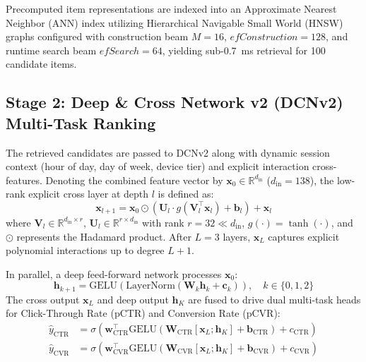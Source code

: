 Precomputed item representations are indexed into an Approximate Nearest Neighbor (ANN) index utilizing Hierarchical Navigable Small World (HNSW) graphs \cite{malkov2020efficient} configured with construction beam $M=16$, $efConstruction=128$, and runtime search beam $efSearch=64$, yielding sub-0.7~ms retrieval for 100 candidate items.

\subsection{Stage 2: Deep \& Cross Network v2 (DCNv2) Multi-Task Ranking}
The retrieved candidates are passed to DCNv2 \cite{wang2021dcn} along with dynamic session context (hour of day, day of week, device tier) and explicit interaction cross-features. Denoting the combined feature vector by $\mathbf{x}_0 \in \mathbb{R}^{d_{\text{in}}}$ ($d_{\text{in}} = 138$), the low-rank explicit cross layer at depth $l$ is defined as:
\begin{equation}
\mathbf{x}_{l+1} = \mathbf{x}_0 \odot \left( \mathbf{U}_l \cdot g\left( \mathbf{V}_l^\top \mathbf{x}_l \right) + \mathbf{b}_l \right) + \mathbf{x}_l
\end{equation}
where $\mathbf{V}_l \in \mathbb{R}^{d_{\text{in}} \times r}$, $\mathbf{U}_l \in \mathbb{R}^{r \times d_{\text{in}}}$ with rank $r = 32 \ll d_{\text{in}}$, $g(\cdot) = \tanh(\cdot)$, and $\odot$ represents the Hadamard product. After $L=3$ layers, $\mathbf{x}_L$ captures explicit polynomial interactions up to degree $L+1$.

In parallel, a deep feed-forward network processes $\mathbf{x}_0$:
\begin{equation}
\mathbf{h}_{k+1} = \text{GELU}\left(\text{LayerNorm}\left(\mathbf{W}_k \mathbf{h}_k + \mathbf{c}_k\right)\right), \quad k \in \{0, 1, 2\}
\end{equation}
The cross output $\mathbf{x}_L$ and deep output $\mathbf{h}_K$ are fused to drive dual multi-task heads for Click-Through Rate ($\text{pCTR}$) and Conversion Rate ($\text{pCVR}$):
\begin{align}
\hat{y}_{\text{CTR}} &= \sigma\left( \mathbf{w}_{\text{CTR}}^\top \text{GELU}(\mathbf{W}_{\text{CTR}} [\mathbf{x}_L; \mathbf{h}_K] + \mathbf{b}_{\text{CTR}}) + c_{\text{CTR}} \right) \\
\hat{y}_{\text{CVR}} &= \sigma\left( \mathbf{w}_{\text{CVR}}^\top \text{GELU}(\mathbf{W}_{\text{CVR}} [\mathbf{x}_L; \mathbf{h}_K] + \mathbf{b}_{\text{CVR}}) + c_{\text{CVR}} \right)
\end{align}

